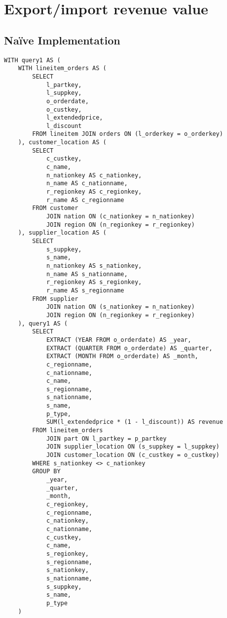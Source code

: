 

\section{Export/import revenue value}

\subsection{Na\"{i}ve Implementation}

\begin{lstlisting}
WITH query1 AS (
	WITH lineitem_orders AS (
		SELECT 
			l_partkey, 
			l_suppkey, 
			o_orderdate, 
			o_custkey, 
			l_extendedprice, 
			l_discount
		FROM lineitem JOIN orders ON (l_orderkey = o_orderkey)
	), customer_location AS (
		SELECT 
			c_custkey, 
			c_name, 
			n_nationkey AS c_nationkey, 
			n_name AS c_nationname, 
			r_regionkey AS c_regionkey, 
			r_name AS c_regionname 
		FROM customer 
			JOIN nation ON (c_nationkey = n_nationkey)
			JOIN region ON (n_regionkey = r_regionkey)
	), supplier_location AS (
		SELECT 
			s_suppkey, 
			s_name, 
			n_nationkey AS s_nationkey, 
			n_name AS s_nationname, 
			r_regionkey AS s_regionkey, 
			r_name AS s_regionname 
		FROM supplier 
			JOIN nation ON (s_nationkey = n_nationkey)
			JOIN region ON (n_regionkey = r_regionkey)
	), query1 AS (
		SELECT
			EXTRACT (YEAR FROM o_orderdate) AS _year,
			EXTRACT (QUARTER FROM o_orderdate) AS _quarter,
			EXTRACT (MONTH FROM o_orderdate) AS _month,
			c_regionname,
			c_nationname,
			c_name,
			s_regionname,
			s_nationname,
			s_name,
			p_type,
			SUM(l_extendedprice * (1 - l_discount)) AS revenue
		FROM lineitem_orders 
			JOIN part ON l_partkey = p_partkey
			JOIN supplier_location ON (s_suppkey = l_suppkey)
			JOIN customer_location ON (c_custkey = o_custkey)
		WHERE s_nationkey <> c_nationkey
		GROUP BY
			_year,
			_quarter,
			_month,
			c_regionkey,
			c_regionname,
			c_nationkey,
			c_nationname,
			c_custkey,
			c_name,
			s_regionkey,
			s_regionname,
			s_nationkey,
			s_nationname,
			s_suppkey,
			s_name,
			p_type
	) 
\end{lstlisting}